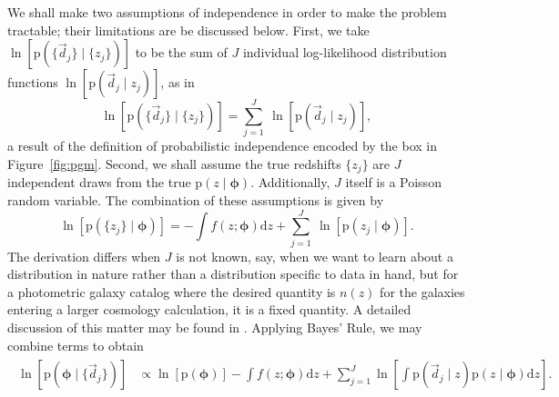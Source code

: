 \documentclass[iop]{emulateapj}
\newcommand{\Sect}[1]{Section~\ref{#1}}
\newcommand{\Eq}[1]{Equation~\ref{#1}}
\newcommand{\Fig}[1]{Figure~\ref{#1}}
\newcommand{\data}{\ensuremath{\vec{d}}}%
\newcommand{\pr}[1]{\ensuremath{\mathrm{p}(#1)}}%
\newcommand{\gvn}{\mid}%
\newcommand{\integral}[2]{\ensuremath{\int #1 \mathrm{d} #2}}
\newcommand{\bvec}[1]{\ensuremath{\boldsymbol{#1}}}%
\newcommand{\ndphi}{\bvec{\phi}}
\begin{document}
We shall make two assumptions of independence in order to make the problem tractable; their limitations are be discussed below.  
First, we take $\ln[\pr{\{\data_{j}\} \gvn \{z_{j}\}}]$ to be the sum of $J$ individual log-likelihood distribution functions $\ln[\pr{\data_{j} \gvn z_{j}}]$, as in 
\begin{equation}
\label{eqn:indiedat}
\ln[\pr{\{\data_{j}\} \gvn \{z_{j}\}}] = \sum_{j=1}^{J}\ \ln[\pr{\data_{j} \gvn z_{j}}],
\end{equation}
a result of the definition of probabilistic independence encoded by the box in \Fig{fig:pgm}.
Second, we shall assume the true redshifts $\{z_{j}\}$ are $J$ independent draws from the true $\pr{z \gvn \ndphi}$.  
Additionally, $J$ itself is a Poisson random variable.  
The combination of these assumptions is given by 
\begin{equation}
\label{eqn:indie}
\ln[\pr{\{z_{j}\} \gvn \ndphi}] = -\integral{f(z; \ndphi)}{z} + \sum_{j=1}^{J}\ \ln[\pr{z_{j} \gvn \ndphi}].
\end{equation}
The derivation differs when $J$ is not known, say, when we want to learn about a distribution in nature rather than a distribution specific to data in hand, but for a photometric galaxy catalog where the desired quantity is $n(z)$ for the galaxies entering a larger cosmology calculation, it is a fixed quantity.
A detailed discussion of this matter may be found in \citet{foreman-mackey_exoplanet_2014}.  
Applying Bayes' Rule, we may combine terms to obtain 
\begin{align}
\begin{split}
\label{eqn:posterior}
\ln[\pr{\ndphi \gvn \{\data_{j}\}}] & \propto \ln[\pr{\ndphi}] - \integral{f(z; \ndphi)}{z} + \sum_{j=1}^{J}\ln\left[\integral{\pr{\data_{j} \gvn z} \pr{z \gvn \ndphi}}{z}\right].
\end{split}
\end{align}

\end{document}
